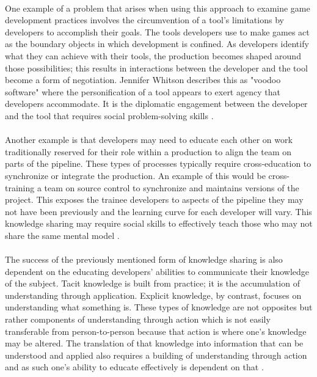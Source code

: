 \paragraph{} One example of a problem that arises when using this approach to examine game development practices involves the circumvention of a tool's limitations by developers to accomplish their goals. The tools developers use to make games act as the boundary objects in which development is confined. As developers identify what they can achieve with their tools, the production becomes shaped around those possibilities; this results in interactions between the developer and the tool become a form of negotiation. Jennifer Whitson describes this as "voodoo software" where the personification of a tool appears to exert agency that developers accommodate. It is the diplomatic engagement between the developer and the tool that requires social problem-solving skills \autocite{whitson_voodoo_2018}.

\paragraph{} Another example is that developers may need to educate each other on work traditionally reserved for their role within a production to align the team on parts of the pipeline. These types of processes typically require cross-education to synchronize or integrate the production. An example of this would be cross-training a team on source control to synchronize and maintains versions of the project. This exposes the trainee developers to aspects of the pipeline they may not have been previously and the learning curve for each developer will vary. This knowledge sharing may require social skills to effectively teach those who may not share the same mental model \autocite{whitson_what_2020}.

\paragraph{} The success of the previously mentioned form of knowledge sharing is also dependent on the educating developers' abilities to communicate their knowledge of the subject. Tacit knowledge is built from practice; it is the accumulation of understanding through application. Explicit knowledge, by contrast, focuses on understanding what something is. These types of knowledge are not opposites but rather components of understanding through action which is not easily transferable from person-to-person because that action is where one's knowledge may be altered. The translation of that knowledge into information that can be understood and applied also requires a building of understanding through action and as such one's ability to educate effectively is dependent on that \autocite{orlikowski_knowing_2002}.

